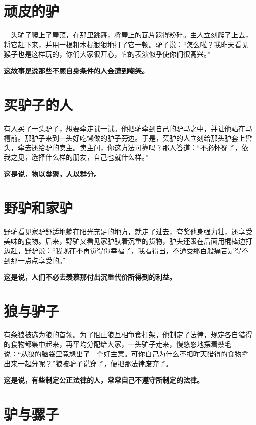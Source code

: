 \section{顽皮的驴}

一头驴子爬上了屋顶，在那里跳舞，将屋上的瓦片踩得粉碎。主人立刻爬了上去，将它赶下来，并用一根粗木棍狠狠地打了它一顿。驴子说：“怎么啦？我昨天看见猴子也是这样玩的，你们大家很开心，它的表演似乎使你们很高兴。”

{\bfseries \color{red}这故事是说那些不顾自身条件的人会遭到嘲笑。}

\section{买驴子的人}

有人买了一头驴子，想要牵走试一试。他把驴牵到自己的驴马之中，并让他站在马槽前。那驴子来到一头好吃懒做的驴子旁边。于是，买驴的人立刻给那头驴套上辔头，牵去还给驴的卖主。卖主问，你这方法可靠吗？那人答道：“不必怀疑了，依我之见，选择什么样的朋友，自己也就什么样。”

{\bfseries \color{red}这是说，物以类聚，人以群分。}

\section{野驴和家驴}

野驴看见家驴舒适地躺在阳光充足的地方，就走了过去，夸奖他身强力壮，还享受美味的食物。后来，野驴又看见家驴驮着沉重的货物，驴夫还跟在后面用棍棒边打边赶，野驴说：“我现在不再觉得你幸福了，我看得出，不遭受那百般痛苦是得不到那一点点享受的。”

{\bfseries \color{red}这是说，人们不必去羡慕那付出沉重代价所得到的利益。}

\section{狼与驴子}

有条狼被选为狼的首领。为了阻止狼互相争食打架，他制定了法律，规定各自猎得的食物都集中起来，再平均分配给大家，一头驴子走来，慢悠悠地摆着鬃毛说：“从狼的脑袋里竟想出了一个好主意。可你自己为什么不把昨天猎得的食物拿出来一起分呢？”狼被驴子说穿了，便把那法律废弃了。

{\bfseries \color{red}这是说，有些制定公正法律的人，常常自己不遵守所制定的法律。}

\section{驴与骡子}

